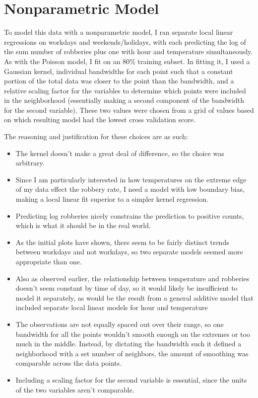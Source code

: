 \documentclass[11pt]{article}
\theoremstyle{definition}
\begin{document}
\section{Nonparametric Model} 
To model this data with a nonparametric model, I ran separate local linear regressions on workdays and weekends/holidays, with each predicting the log of the sum number of robberies plus one with hour and temperature simultaneously. As with the Poisson model, I fit on an $80\%$ training subset. In fitting it, I used a Gaussian kernel, individual bandwidths for each point such that a constant portion of the total data was closer to the point than the bandwidth, and a relative scaling factor for the variables to determine which points were included in the neighborhood (essentially making a second component of the bandwidth for the second variable). These two values were chosen from a grid of values based on which resulting model had the lowest cross validation score. \par
The reasoning and justification for these choices are as such:
\begin{itemize}
    \item The kernel doesn't make a great deal of difference, so the choice was arbitrary. 
    \item Since I am particularly interested in how temperatures on the extreme edge of my data effect the robbery rate, I need a model with low boundary bias, making a local linear fit superior to a simpler kernel regression.
    \item Predicting log robberies nicely constrains the prediction to positive counts, which is what it should be in the real world.
    \item As the initial plots have shown, there seem to be fairly distinct trends between workdays and not workdays, so two separate models seemed more appropriate than one.
    \item Also as observed earlier, the relationship between temperature and robberies doesn't seem constant by time of day, so it would likely be insufficient to model it separately, as would be the result from a general additive model that included separate local linear models for hour and temperature
    \item The observations are not equally spaced out over their range, so one bandwidth for all the points wouldn't smooth enough on the extremes or too much in the middle. Instead, by dictating the bandwidth such it defined a neighborhood with a set number of neighbors, the amount of smoothing was comparable across the data points.
    \item Including a scaling factor for the second variable is essential, since the units of the two variables aren't comparable.
\end{itemize} \par
\end{document}
